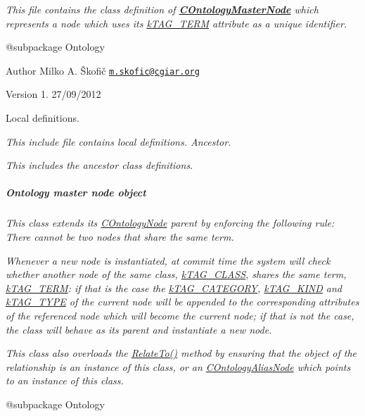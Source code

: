 {\itshape This file contains the class definition of {\bfseries \hyperlink{class_c_ontology_master_node}{C\-Ontology\-Master\-Node}} which represents a node which uses its \hyperlink{}{k\-T\-A\-G\-\_\-\-T\-E\-R\-M} attribute as a unique identifier.}

{\itshape \begin{DoxyVerb} @subpackage        Ontology
\end{DoxyVerb}
}

{\itshape \begin{DoxyAuthor}{Author}
Milko A. Škofič \href{mailto:m.skofic@cgiar.org}{\tt m.\-skofic@cgiar.\-org} 
\end{DoxyAuthor}
\begin{DoxyVersion}{Version}
1. 27/09/2012
\end{DoxyVersion}
Local definitions.}

{\itshape This include file contains local definitions. Ancestor.}

{\itshape This includes the ancestor class definitions. \subparagraph*{Ontology master node object}}

{\itshape }

{\itshape This class extends its \hyperlink{class_c_ontology_node}{C\-Ontology\-Node} parent by enforcing the following rule\-: {\itshape There cannot be two nodes that share the same term}.}

{\itshape Whenever a new node is instantiated, at commit time the system will check whether another node of the same class, \hyperlink{}{k\-T\-A\-G\-\_\-\-C\-L\-A\-S\-S}, shares the same term, \hyperlink{}{k\-T\-A\-G\-\_\-\-T\-E\-R\-M}\-: if that is the case the \hyperlink{}{k\-T\-A\-G\-\_\-\-C\-A\-T\-E\-G\-O\-R\-Y}, \hyperlink{}{k\-T\-A\-G\-\_\-\-K\-I\-N\-D} and \hyperlink{}{k\-T\-A\-G\-\_\-\-T\-Y\-P\-E} of the current node will be appended to the corresponding attributes of the referenced node which will become the current node; if that is not the case, the class will behave as its parent and instantiate a new node.}

{\itshape This class also overloads the \hyperlink{}{Relate\-To()} method by ensuring that the object of the relationship is an instance of this class, or an \hyperlink{class_c_ontology_alias_node}{C\-Ontology\-Alias\-Node} which points to an instance of this class.}

{\itshape \begin{DoxyVerb} @subpackage        Ontology\end{DoxyVerb}
}


